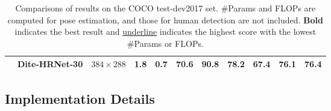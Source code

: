 \documentclass{article}
\begin{document}
\begin{table*}[t]
{\begin{tabular}{llcrccccccc}
& \textbf{Dite-HRNet-30} & $384 \times 288$ & 1.8 & 0.7 & \textbf{70.6} & \textbf{90.8} & \textbf{78.2} & \textbf{67.4} & \textbf{76.1} & \textbf{76.4}\\
\bottomrule
\end{tabular}}
\caption{Comparisons of results on the COCO test-dev2017 set. \#Params and FLOPs are computed for pose estimation, and those for human detection are not included. \textbf{Bold} indicates the best result and \underline{underline} indicates the highest score with the lowest \#Params or FLOPs.}
\label{tab3}
\end{table*}

\begin{table}[t]
\centering
{}
\caption{Comparisons of results on the MPII val set. \textbf{Bold} indicates the best result and \underline{underline} indicates the second-best result.}
\label{tab4}
\end{table}

\subsection{Implementation Details}
\end{document}
